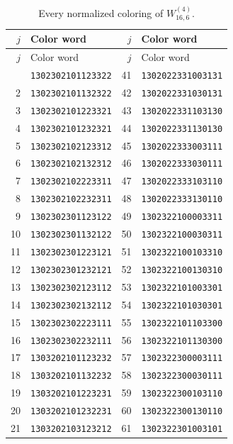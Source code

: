 \documentclass[aps,pra,reprint,superscriptaddress,longbibliography,nofootinbib,floatfix,10pt]{revtex4-2}
\theoremstyle{definition}
\begin{document}
\begin{longtable}{rl@{\qquad}rl}
\caption{Every normalized coloring of $W_{16,6}^{(4)}$.}\label{tab:colors-4b}\\\toprule $j$ & Color word & $j$ & Color word\\\midrule\endfirsthead
\toprule $j$ & Color word & $j$ & Color word\\\midrule\endhead\bottomrule\endfoot
1 & \texttt{1302302101123322} & 41 & \texttt{1302022331003131}\\
2 & \texttt{1302302101132322} & 42 & \texttt{1302022331030131}\\
3 & \texttt{1302302101223321} & 43 & \texttt{1302022331103130}\\
4 & \texttt{1302302101232321} & 44 & \texttt{1302022331130130}\\
5 & \texttt{1302302102123312} & 45 & \texttt{1302022333003111}\\
6 & \texttt{1302302102132312} & 46 & \texttt{1302022333030111}\\
7 & \texttt{1302302102223311} & 47 & \texttt{1302022333103110}\\
8 & \texttt{1302302102232311} & 48 & \texttt{1302022333130110}\\
9 & \texttt{1302302301123122} & 49 & \texttt{1302322100003311}\\
10 & \texttt{1302302301132122} & 50 & \texttt{1302322100030311}\\
11 & \texttt{1302302301223121} & 51 & \texttt{1302322100103310}\\
12 & \texttt{1302302301232121} & 52 & \texttt{1302322100130310}\\
13 & \texttt{1302302302123112} & 53 & \texttt{1302322101003301}\\
14 & \texttt{1302302302132112} & 54 & \texttt{1302322101030301}\\
15 & \texttt{1302302302223111} & 55 & \texttt{1302322101103300}\\
16 & \texttt{1302302302232111} & 56 & \texttt{1302322101130300}\\
17 & \texttt{1303202101123232} & 57 & \texttt{1302322300003111}\\
18 & \texttt{1303202101132232} & 58 & \texttt{1302322300030111}\\
19 & \texttt{1303202101223231} & 59 & \texttt{1302322300103110}\\
20 & \texttt{1303202101232231} & 60 & \texttt{1302322300130110}\\
21 & \texttt{1303202103123212} & 61 & \texttt{1302322301003101}\\

\end{longtable}
\end{document}
